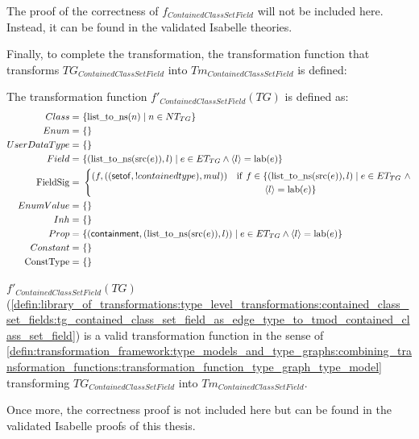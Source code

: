 The proof of the correctness of $f_{ContainedClassSetField}$ will not be included here. Instead, it can be found in the validated Isabelle theories.

Finally, to complete the transformation, the transformation function that transforms $TG_{ContainedClassSetField}$ into $Tm_{ContainedClassSetField}$ is defined:

\begin{defin}
\label{defin:library_of_transformations:type_level_transformations:contained_class_set_fields:tg_contained_class_set_field_as_edge_type_to_tmod_contained_class_set_field}
The transformation function $f'_{ContainedClassSetField}(TG)$ is defined as:
\begin{align*}
Class =\ &\{\mathrm{list\_\!to\_\!ns}(n) \mid n \in NT_{TG} \} \\
Enum =\ &\{\} \\
UserDataType =\ &\{\} \\
Field =\ &\{(\mathrm{list\_\!to\_\!ns}(\mathrm{src}(e)), l) \mid e \in ET_{TG} \land \langle l \rangle = \mathrm{lab}(e) \} \\
\mathrm{FieldSig} =\ &\begin{cases}
    (f, ((\type{setof}, !containedtype), mul)) &\mathrm{if}\ f \in \{(\mathrm{list\_\!to\_\!ns}(\mathrm{src}(e)), l) \mid e \in ET_{TG}\ \land\\&\qquad\quad \langle l \rangle = \mathrm{lab}(e) \} 
\end{cases} \\
EnumValue =\ &\{\} \\
Inh =\ &\{\} \\
Prop =\ &\{(\type{containment}, (\mathrm{list\_\!to\_\!ns}(\mathrm{src}(e)), l)) \mid e \in ET_{TG} \land \langle l \rangle = \mathrm{lab}(e) \} \\
Constant =\ &\{\} \\
\mathrm{ConstType} =\ &\{\}
\end{align*}
\end{defin}

\begin{thm}
\label{defin:library_of_transformations:type_level_transformations:contained_class_set_fields:tg_contained_class_set_field_as_edge_type_to_tmod_contained_class_set_field_func}
$f'_{ContainedClassSetField}(TG)$ (\cref{defin:library_of_transformations:type_level_transformations:contained_class_set_fields:tg_contained_class_set_field_as_edge_type_to_tmod_contained_class_set_field}) is a valid transformation function in the sense of \cref{defin:transformation_framework:type_models_and_type_graphs:combining_transformation_functions:transformation_function_type_graph_type_model} transforming $TG_{ContainedClassSetField}$ into $Tm_{ContainedClassSetField}$.
\end{thm}

Once more, the correctness proof is not included here but can be found in the validated Isabelle proofs of this thesis.